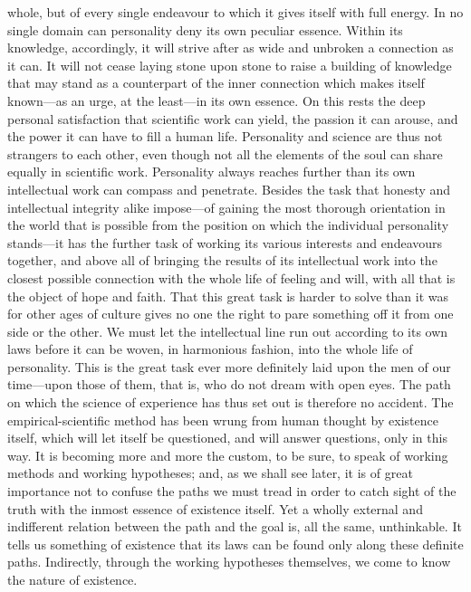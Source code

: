 \documentclass[12pt,a4paper]{article}
\newcommand{\opage}[1]{\marginnote{\footnotesize\textit{[#1]}}}
\begin{document}
whole, but of every single endeavour to which it gives itself with full energy. In
no single domain can personality deny its own peculiar essence. Within its
knowledge, accordingly, it will strive after as wide and unbroken a connection as it
can. It will not cease laying stone upon stone to raise a building of knowledge that
may stand as a counterpart of the inner connection which makes itself known---as an
urge, at the least---in its own essence. On this rests the deep personal
satisfaction that scientific work can yield, the passion it can arouse, and the power
it can have to fill a human life. Personality and science are thus not strangers to
each other, even though not all the elements of the soul can share equally in
scientific work. Personality always reaches further than its own intellectual work
can compass and penetrate. Besides the task that honesty and intellectual integrity
alike impose---of gaining the most thorough orientation in the world that is possible
from the position on which the individual personality stands---it has the further
\opage{24}task of working its various interests and endeavours together, and above all of
bringing the results of its intellectual work into the closest possible connection
with the whole life of feeling and will, with all that is the object of hope and
faith. That this great task is harder to solve than it was for other ages of culture
gives no one the right to pare something off it from one side or the other. We must
let the intellectual line run out according to its own laws before it can be woven,
in harmonious fashion, into the whole life of personality. This is the great task
ever more definitely laid upon the men of our time---upon those of them, that is, who
do not dream with open eyes.
The path on which the science of experience has thus set out is therefore no
accident. The empirical-scientific method has been wrung from human thought by
existence itself, which will let itself be questioned, and will answer questions,
only in this way. It is becoming more and more the custom, to be sure, to speak of
working methods and working hypotheses; and, as we shall see later, it is of great
importance not to confuse the paths we must tread in order to catch sight of the
truth with the inmost essence of existence itself. Yet a wholly external and
indifferent relation between the path and the goal is, all the same, unthinkable.
It tells us something of existence that its laws can be found only along these
definite paths. Indirectly, through the working hypotheses themselves, we come to
know the nature of existence.
\end{document}
